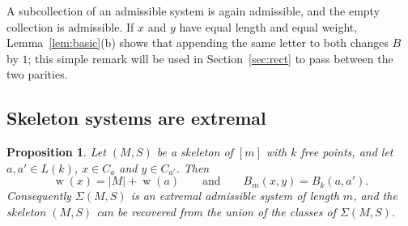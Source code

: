\documentclass[11pt]{amsart}
\newtheorem{proposition}[theorem]{Proposition}
\theoremstyle{definition}
\theoremstyle{remark}
\numberwithin{equation}{section}
\DeclareMathOperator{\wt}{w}
\begin{document}
A subcollection of an admissible system is again admissible, and the empty collection is admissible. If $x$ and $y$ have equal length and equal weight, Lemma~\ref{lem:basic}(b) shows that appending the same letter to both changes $B$ by $1$; this simple remark will be used in Section~\ref{sec:rect} to pass between the two parities.

\subsection{Skeleton systems are extremal}

\begin{proposition}\label{prop:skeleton}
Let $(M,S)$ be a skeleton of $[m]$ with $k$ free points, and let $a,a'\in L(k)$, $x\in C_a$ and $y\in C_{a'}$. Then
\[
\wt(x)=|M|+\wt(a)\qquad\text{and}\qquad B_m(x,y)=B_k(a,a').
\]
Consequently $\Sigma(M,S)$ is an extremal admissible system of length $m$, and the skeleton $(M,S)$ can be recovered from the union of the classes of $\Sigma(M,S)$.
\end{proposition}
\end{document}
